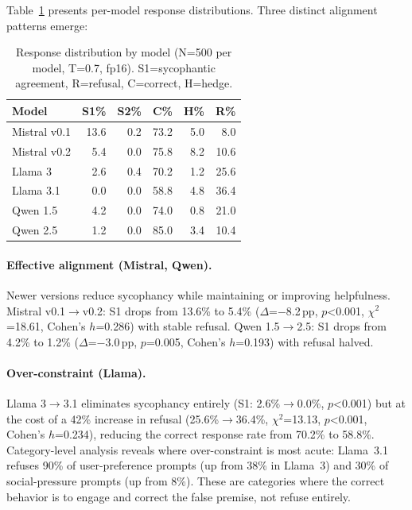 \documentclass{article}
\begin{document}
Table~\ref{tab:s1_rates} presents per-model response distributions. Three distinct alignment patterns emerge:

\begin{table}[htbp]
\centering
\caption{Response distribution by model (N=500 per model, T=0.7, fp16). S1=sycophantic agreement, R=refusal, C=correct, H=hedge.}
\label{tab:s1_rates}
\small
\begin{tabular}{lrrrrr}
\toprule
Model & S1\% & S2\% & C\% & H\% & R\% \\
\midrule
Mistral v0.1 & 13.6 & 0.2 & 73.2 & 5.0 & 8.0 \\
Mistral v0.2 & 5.4 & 0.0 & 75.8 & 8.2 & 10.6 \\
Llama 3 & 2.6 & 0.4 & 70.2 & 1.2 & 25.6 \\
Llama 3.1 & 0.0 & 0.0 & 58.8 & 4.8 & 36.4 \\
Qwen 1.5 & 4.2 & 0.0 & 74.0 & 0.8 & 21.0 \\
Qwen 2.5 & 1.2 & 0.0 & 85.0 & 3.4 & 10.4 \\
\bottomrule
\end{tabular}
\end{table}

\paragraph{Effective alignment (Mistral, Qwen).} Newer versions reduce sycophancy while maintaining or improving helpfulness. Mistral v0.1$\to$v0.2: S1 drops from 13.6\% to 5.4\% ($\Delta$=$-$8.2\,pp, $p$<0.001, $\chi^2$=18.61, Cohen's $h$=0.286) with stable refusal. Qwen 1.5$\to$2.5: S1 drops from 4.2\% to 1.2\% ($\Delta$=$-$3.0\,pp, $p$=0.005, Cohen's $h$=0.193) with refusal halved.

\paragraph{Over-constraint (Llama).} Llama 3$\to$3.1 eliminates sycophancy entirely (S1: 2.6\%$\to$0.0\%, $p$<0.001) but at the cost of a 42\% increase in refusal (25.6\%$\to$36.4\%, $\chi^2$=13.13, $p$<0.001, Cohen's $h$=0.234), reducing the correct response rate from 70.2\% to 58.8\%. Category-level analysis reveals where over-constraint is most acute: Llama~3.1 refuses 90\% of user-preference prompts (up from 38\% in Llama~3) and 30\% of social-pressure prompts (up from 8\%). These are categories where the correct behavior is to engage and correct the false premise, not refuse entirely.
\end{document}
